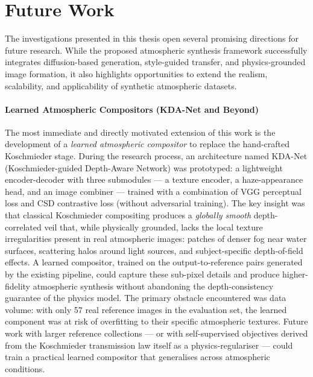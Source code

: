 \section{Future Work}
\label{sec:future_work}

\noindent The investigations presented in this thesis open several promising directions for future research. While the proposed atmospheric synthesis framework successfully integrates diffusion-based generation, style-guided transfer, and physics-grounded image formation, it also highlights opportunities to extend the realism, scalability, and applicability of synthetic atmospheric datasets.

\paragraph{Learned Atmospheric Compositors (KDA-Net and Beyond)}
The most immediate and directly motivated extension of this work is the development of a \emph{learned atmospheric compositor} to replace the hand-crafted Koschmieder stage. During the research process, an architecture named KDA-Net (Koschmieder-guided Depth-Aware Network) was prototyped: a lightweight encoder-decoder with three submodules --- a texture encoder, a haze-appearance head, and an image combiner --- trained with a combination of VGG perceptual loss and CSD contrastive loss (without adversarial training). The key insight was that classical Koschmieder compositing produces a \emph{globally smooth} depth-correlated veil that, while physically grounded, lacks the local texture irregularities present in real atmospheric images: patches of denser fog near water surfaces, scattering halos around light sources, and subject-specific depth-of-field effects. A learned compositor, trained on the output-to-reference pairs generated by the existing pipeline, could capture these sub-pixel details and produce higher-fidelity atmospheric synthesis without abandoning the depth-consistency guarantee of the physics model. The primary obstacle encountered was data volume: with only 57 real reference images in the evaluation set, the learned component was at risk of overfitting to their specific atmospheric textures. Future work with larger reference collections --- or with self-supervised objectives derived from the Koschmieder transmission law itself as a physics-regulariser --- could train a practical learned compositor that generalises across atmospheric conditions.

